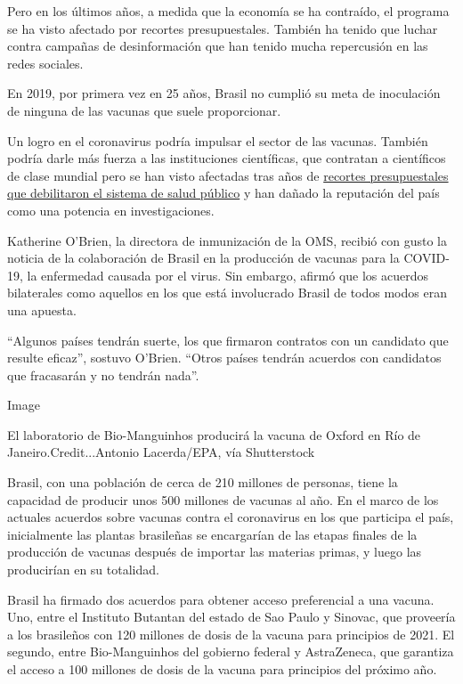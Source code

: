 Pero en los últimos años, a medida que la economía se ha contraído, el
programa se ha visto afectado por recortes presupuestales. También ha
tenido que luchar contra campañas de desinformación que han tenido mucha
repercusión en las redes sociales.

En 2019, por primera vez en 25 años, Brasil no cumplió su meta de
inoculación de ninguna de las vacunas que suele proporcionar.

Un logro en el coronavirus podría impulsar el sector de las vacunas.
También podría darle más fuerza a las instituciones científicas, que
contratan a científicos de clase mundial pero se han visto afectadas
tras años de
\href{https://www.nytimes3xbfgragh.onion/es/2020/04/09/espanol/coronavirus-paises-desarrollo.html}{recortes
presupuestales que debilitaron el sistema de salud público} y han dañado
la reputación del país como una potencia en investigaciones.

Katherine O'Brien, la directora de inmunización de la OMS, recibió con
gusto la noticia de la colaboración de Brasil en la producción de
vacunas para la COVID-19, la enfermedad causada por el virus. Sin
embargo, afirmó que los acuerdos bilaterales como aquellos en los que
está involucrado Brasil de todos modos eran una apuesta.

``Algunos países tendrán suerte, los que firmaron contratos con un
candidato que resulte eficaz'', sostuvo O'Brien. ``Otros países tendrán
acuerdos con candidatos que fracasarán y no tendrán nada''.

Image

El laboratorio de Bio-Manguinhos producirá la vacuna de Oxford en Río de
Janeiro.Credit...Antonio Lacerda/EPA, vía Shutterstock

Brasil, con una población de cerca de 210 millones de personas, tiene la
capacidad de producir unos 500 millones de vacunas al año. En el marco
de los actuales acuerdos sobre vacunas contra el coronavirus en los que
participa el país, inicialmente las plantas brasileñas se encargarían de
las etapas finales de la producción de vacunas después de importar las
materias primas, y luego las producirían en su totalidad.

Brasil ha firmado dos acuerdos para obtener acceso preferencial a una
vacuna. Uno, entre el Instituto Butantan del estado de Sao Paulo y
Sinovac, que proveería a los brasileños con 120 millones de dosis de la
vacuna para principios de 2021. El segundo, entre Bio-Manguinhos del
gobierno federal y AstraZeneca, que garantiza el acceso a 100 millones
de dosis de la vacuna para principios del próximo año.

